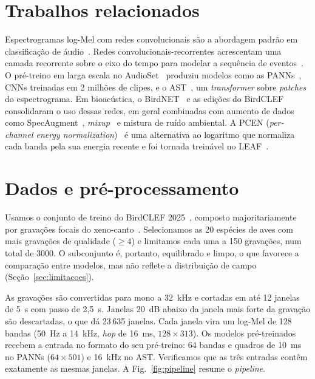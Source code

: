 \documentclass[conference]{IEEEtran}
\begin{document}
\section{Trabalhos relacionados}

Espectrogramas log-Mel com redes convolucionais são a abordagem padrão em classificação de áudio~\cite{hershey2017}. Redes convolucionais-recorrentes acrescentam uma camada recorrente sobre o eixo do tempo para modelar a sequência de eventos~\cite{choi2017crnn}. O pré-treino em larga escala no AudioSet~\cite{gemmeke2017audioset} produziu modelos como as PANNs~\cite{kong2020panns}, CNNs treinadas em 2 milhões de clipes, e o AST~\cite{gong2021ast}, um \textit{transformer} sobre \textit{patches} do espectrograma. Em bioacústica, o BirdNET~\cite{kahl2021birdnet} e as edições do BirdCLEF~\cite{kahl2021birdclef} consolidaram o uso dessas redes, em geral combinadas com aumento de dados como SpecAugment~\cite{park2019specaugment}, \textit{mixup}~\cite{zhang2018mixup} e mistura de ruído ambiental. A PCEN (\textit{per-channel energy normalization})~\cite{wang2017pcen} é uma alternativa ao logaritmo que normaliza cada banda pela sua energia recente e foi tornada treinável no LEAF~\cite{zeghidour2021leaf}.

\section{Dados e pré-processamento}

Usamos o conjunto de treino do BirdCLEF 2025~\cite{birdclef2025}, composto majoritariamente por gravações focais do xeno-canto~\cite{xenocanto}. Selecionamos as 20 espécies de aves com mais gravações de qualidade ($\geq 4$) e limitamos cada uma a 150 gravações, num total de 3000. O subconjunto é, portanto, equilibrado e limpo, o que favorece a comparação entre modelos, mas não reflete a distribuição de campo (Seção~\ref{sec:limitacoes}).

As gravações são convertidas para mono a 32~kHz e cortadas em até 12 janelas de 5~s com passo de 2{,}5~s. Janelas 20~dB abaixo da janela mais forte da gravação são descartadas, o que dá 23\,635 janelas. Cada janela vira um log-Mel de 128 bandas (50~Hz a 14~kHz, \textit{hop} de 16~ms, $128 \times 313$). Os modelos pré-treinados recebem a entrada no formato do seu pré-treino: 64 bandas e quadros de 10~ms no PANNs ($64 \times 501$) e 16~kHz no AST. Verificamos que as três entradas contêm exatamente as mesmas janelas. A Fig.~\ref{fig:pipeline} resume o \textit{pipeline}.
\end{document}
